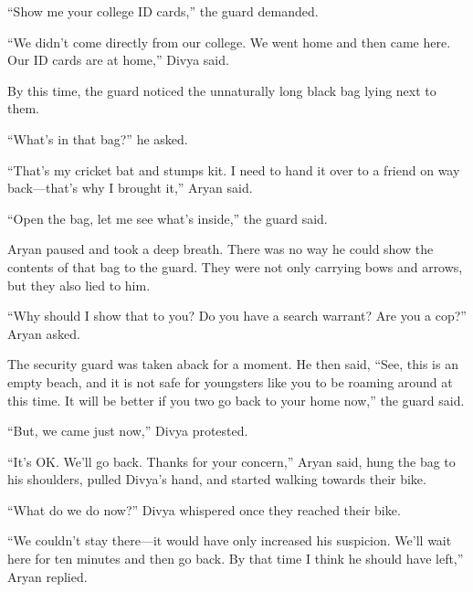 “Show me your college ID cards,” the guard demanded.

“We didn't come directly from our college. We went home and then came here. Our
ID cards are at home,” Divya said.

By this time, the guard noticed the unnaturally long black bag lying next to
them.

“What's in that bag?” he asked.

“That's my cricket bat and stumps kit. I need to hand it over to a friend on way
back—that's why I brought it,” Aryan said.

“Open the bag, let me see what's inside,” the guard said.

Aryan paused and took a deep breath. There was no way he could show the contents
of that bag to the guard. They were not only carrying bows and arrows, but they
also lied to him.

“Why should I show that to you? Do you have a search warrant? Are you a cop?”
Aryan asked.

The security guard was taken aback for a moment. He then said, “See, this is an
empty beach, and it is not safe for youngsters like you to be roaming around at
this time. It will be better if you two go back to your home now,” the guard
said.

“But, we came just now,” Divya protested.

“It's OK. We'll go back. Thanks for your concern,” Aryan said, hung the bag to
his shoulders, pulled Divya's hand, and started walking towards their bike.

“What do we do now?” Divya whispered once they reached their bike.

“We couldn't stay there—it would have only increased his suspicion. We'll wait
here for ten minutes and then go back. By that time I think he should have
left,” Aryan replied.